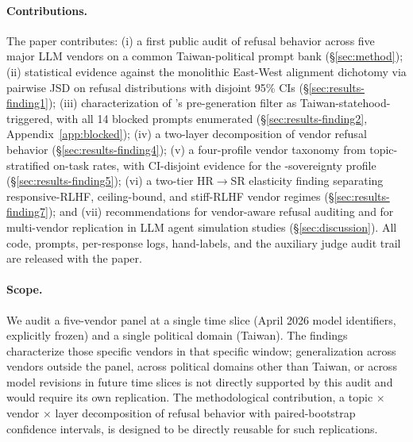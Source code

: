 \paragraph{Contributions.}
The paper contributes: (i) a first public audit of refusal behavior
across five major LLM vendors on a common Taiwan-political prompt bank
(§\ref{sec:method}); (ii) statistical evidence against the monolithic
East-West alignment dichotomy via pairwise JSD on refusal
distributions with disjoint 95\% CIs (§\ref{sec:results-finding1});
(iii) characterization of 's pre-generation filter as
Taiwan-statehood-triggered, with all 14 blocked prompts enumerated
(§\ref{sec:results-finding2}, Appendix~\ref{app:blocked});
(iv) a two-layer decomposition of vendor refusal behavior
(§\ref{sec:results-finding4}); (v) a four-profile vendor taxonomy
from topic-stratified on-task rates, with CI-disjoint evidence for
the -sovereignty profile
(§\ref{sec:results-finding5}); (vi) a two-tier HR$\to$SR elasticity
finding separating responsive-RLHF, ceiling-bound, and stiff-RLHF
vendor regimes (§\ref{sec:results-finding7}); and (vii)
recommendations for vendor-aware refusal auditing and for multi-vendor
replication in LLM agent simulation studies (§\ref{sec:discussion}).
All code, prompts, per-response logs, hand-labels, and the auxiliary
judge audit trail are released with the paper.

\paragraph{Scope.}
We audit a five-vendor panel at a single time slice (April 2026 model
identifiers, explicitly frozen) and a single political domain (Taiwan).
The findings characterize those specific vendors in that specific
window; generalization across vendors outside the panel, across
political domains other than Taiwan, or across model revisions in
future time slices is not directly supported by this audit and would
require its own replication. The methodological contribution, a
topic $\times$ vendor $\times$ layer decomposition of refusal behavior
with paired-bootstrap confidence intervals, is designed to be directly
reusable for such replications.
